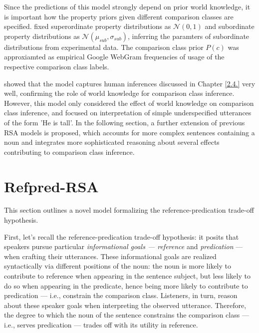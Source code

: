 Since the predictions of this model strongly depend on prior world knowledge, it is important how the property priors given different comparison classes are specified. \textcite{tessler2017warm} fixed superordinate property distributions as $\mathcal{N} (0, 1)$ and subordinate property distributions as $\mathcal{N}(\mu_{sub}, \sigma_{sub})$, inferring the paramters of subordinate distributions from experimental data. The comparison class prior $P(c)$ was approxiamted as empirical Google WebGram frequencies of usage of the respective comparison class labels. 

\textcite{tessler2017warm} showed that the model captures human inferences discussed in Chapter \ref{2.4.} very well, confirming the role of world knowledge for comparison class inference. 
However, this model only considered the effect of world knowledge on comparison class inference, and focused on interpretation of simple underspecified utterances of the form 'He is tall'. In the following section, a further extension of previous RSA models is proposed, which accounts for more complex sentences containing a noun and integrates more sophisticated reasoning about several effects contributing to comparison class inference.  

\section{Refpred-RSA}
This section outlines a novel model formalizing the reference-predication trade-off hypothesis.

First, let's recall the reference-predication trade-off hypothesis: it posits that speakers pursue particular \emph{informational goals --- reference} and \emph{predication} --- when crafting their utterances. These informational goals are realized syntactically via different positions of the noun: the noun is more likely to contribute to reference when appearing in the sentence subject, but less likely to do so when appearing in the predicate, hence being more likely to contribute to predication --- i.e., constrain the comparison class. Listeners, in turn, reason about these speaker goals %
when interpreting the observed utterance.  
Therefore, the degree to which the noun of the sentence constrains the comparison class --- i.e., serves predication --- trades off with its utility in reference. 

